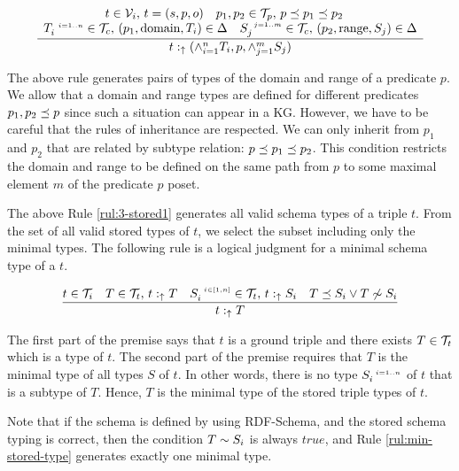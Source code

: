 \documentclass[runningheads]{llncs}
\newcommand{\s}{\scriptscriptstyle\ \,}
\newcommand{\uarr}{\uparrow}
\newcommand{\V}{{\cal V}}
\newcommand{\T}{{\cal T}}
\newcommand{\memo}[1]{}
\begin{document}
\begin{equation}
\label{rul:3-stored1}
\dfrac{\begin{array}{c}
       t\in\V_i,\, t=(s,p,o)\quad p_1,p_2\in\T_p,\, p\preceq\/p_1\preceq\/p_2\quad \\
       T_i^{\s\/i=1..n}\in\T_c,\, (p_1,\text{domain},T_i)\in\/\Delta\quad S_j^{\s\/j=1..m}\in\T_c,\, (p_2,\text{range},S_j)\in\Delta
       \end{array}}
      {t:_\uarr\/(\land_{i=1}^n\/T_i, p, \land_{j=1}^m\/S_j)}
\end{equation}

The above rule generates pairs of types of the domain and range of a
predicate $p$. We allow that a domain and range types are defined for
different predicates $p_1,p_2\preceq\/p$ since such a situation can
appear in a KG. However, we have to be careful that the rules of
inheritance are respected. We can only inherit from $p_1$ and $p_2$
that are related by subtype relation:
$p\preceq\/p_1\preceq\/p_2$. This condition restricts the domain and
range to be defined on the same path from $p$ to some maximal element
$m$ of the predicate $p$ poset. 


The above Rule \ref{rul:3-stored1} generates all valid schema types of
a triple $t$. From the set of all valid stored types of $t$, we select
the subset including only the minimal types. The following rule is a
logical judgment for a minimal schema type of a $t$. 

\begin{equation}
\label{rul:min-stored-type}
\dfrac{t\in\T_i\quad T\in\T_t,\, t:_\uarr\/T\quad\/S_i^{\s\/i\in[1,n]}\in\T_t,\, t:_\uarr\/S_i\quad T\preceq\/S_i\lor\/T\not\sim\/S_i}
      {t:_{\uarr}\/T}
\end{equation}

The first part of the premise says that $t$ is a ground triple and there
exists $T\in\T_t$ which is a type of $t$. The second part of the premise
requires that $T$ is the minimal type of all types $S$ of $t$. In
other words, there is no type $S_i^{\s\/i=1..n}$ of $t$ that is a
subtype of $T$. Hence, $T$ is the minimal type of the stored triple
types of $t$.

Note that if the schema is defined by using RDF-Schema, and the stored
schema typing is correct, then the condition $T\sim\/S_i$ is always
$true$, and Rule \ref{rul:min-stored-type} generates exactly one
minimal type.

\memo{
Furthermore, under the restrictions of RDF-Schema, we can
not define a predicate $p$ with two meanings. If we were to specify two
different domains or ranges of $p$, then the reasoner would treat the
domain and range types as $\land$-types. Each instance of the domain
(range) type has to be an instance of all specified types of the
domain (range).}
\end{document}
